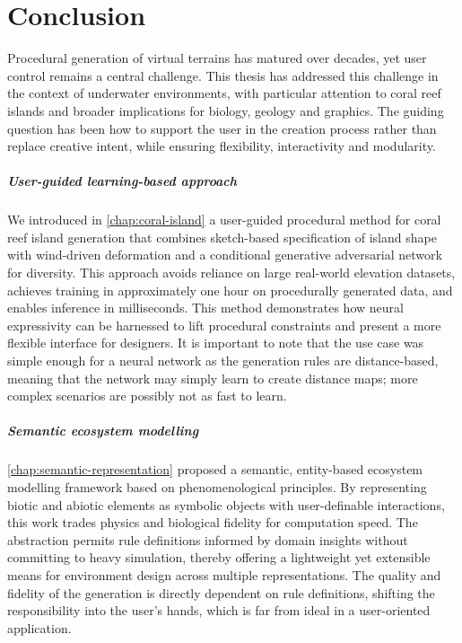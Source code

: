\chapter*{Conclusion}


Procedural generation of virtual terrains has matured over decades, yet user control remains a central challenge. This thesis has addressed this challenge in the context of underwater environments, with particular attention to coral reef islands and broader implications for biology, geology and graphics. The guiding question has been how to support the user in the creation process rather than replace creative intent, while ensuring flexibility, interactivity and modularity.

\paragraph{User-guided learning-based approach} We introduced in \cref{chap:coral-island} a user-guided procedural method for coral reef island generation that combines sketch-based specification of island shape with wind-driven deformation and a conditional generative adversarial network for diversity. This approach avoids reliance on large real-world elevation datasets, achieves training in approximately one hour on procedurally generated data, and enables inference in milliseconds. This method demonstrates how neural expressivity can be harnessed to lift procedural constraints and present a more flexible interface for designers. It is important to note that the use case was simple enough for a neural network as the generation rules are distance-based, meaning that the network may simply learn to create distance maps; more complex scenarios are possibly not as fast to learn.

\paragraph{Semantic ecosystem modelling} \cref{chap:semantic-representation} proposed a semantic, entity-based ecosystem modelling framework based on phenomenological principles. By representing biotic and abiotic elements as symbolic objects with user-definable interactions, this work trades physics and biological fidelity for computation speed. The abstraction permits rule definitions informed by domain insights without committing to heavy simulation, thereby offering a lightweight yet extensible means for environment design across multiple representations. The quality and fidelity of the generation is directly dependent on rule definitions, shifting the responsibility into the user's hands, which is far from ideal in a user-oriented application.


